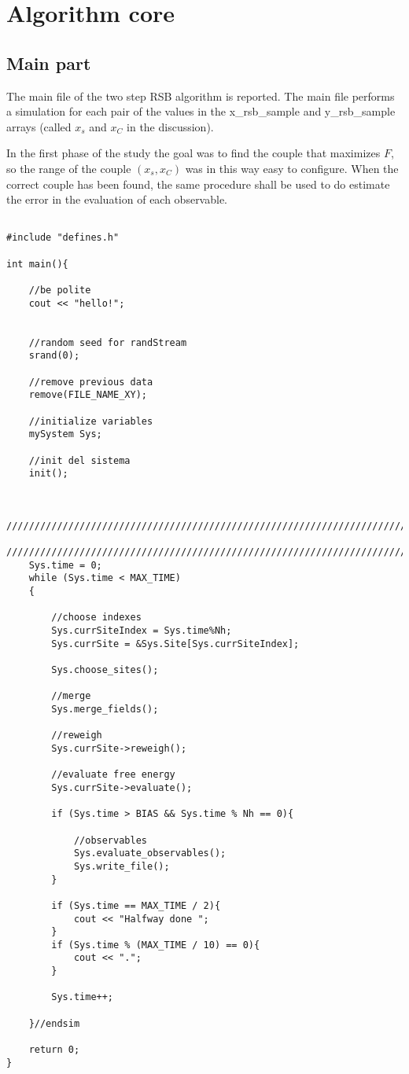 \chapter{Algorithm core}
\section{Main part}
The main file of the two step RSB algorithm is reported. The main file performs a simulation for each pair of the values in the x_rsb_sample and y_rsb_sample arrays (called $x_s$ and $x_C$ in the discussion).

In the first phase of the study the goal was to find the couple that maximizes $F$, so the range of the couple $(x_s,x_C)$ was in this way easy to configure.
When the correct couple has been found, the same procedure shall be used to do estimate the error
in the evaluation of each observable.

\begin{verbatim}

#include "defines.h"

int main(){

	//be polite	
	cout << "hello!";


	//random seed for randStream
	srand(0);

	//remove previous data
	remove(FILE_NAME_XY);

	//initialize variables
	mySystem Sys;

	//init del sistema
	init();


	//////////////////////////////////////////////////////////////////////////////////////////
	//////////////////////////////////////////////////////////////////////////////////////////
	Sys.time = 0;
	while (Sys.time < MAX_TIME)
	{

		//choose indexes
		Sys.currSiteIndex = Sys.time%Nh;
		Sys.currSite = &Sys.Site[Sys.currSiteIndex];

		Sys.choose_sites();

		//merge
		Sys.merge_fields();

		//reweigh
		Sys.currSite->reweigh();

		//evaluate free energy
		Sys.currSite->evaluate();

		if (Sys.time > BIAS && Sys.time % Nh == 0){

			//observables
			Sys.evaluate_observables();
			Sys.write_file();
		}

		if (Sys.time == MAX_TIME / 2){
			cout << "Halfway done ";
		}
		if (Sys.time % (MAX_TIME / 10) == 0){
			cout << ".";
		}

		Sys.time++;

	}//endsim

	return 0;
}



\end{verbatim}

